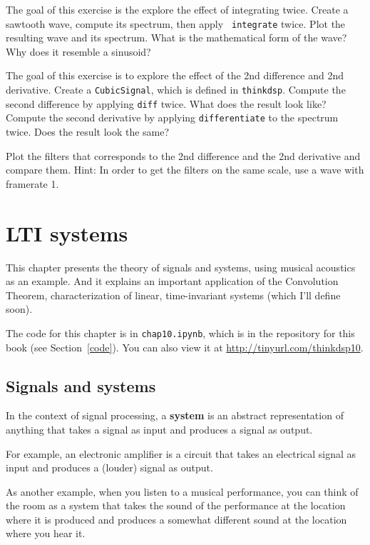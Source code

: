 \documentclass[12pt]{book}
\begin{document}
\begin{exercise}
The goal of this exercise is the explore the effect of integrating
twice. Create a sawtooth wave, compute its spectrum, then apply {\tt
  integrate} twice. Plot the resulting wave and its spectrum. What is
the mathematical form of the wave? Why does it resemble a sinusoid?
\end{exercise}

\begin{exercise}
The goal of this exercise is to explore the effect of the 2nd
difference and 2nd derivative. Create a {\tt CubicSignal}, which is
defined in {\tt thinkdsp}. Compute the second difference by applying
{\tt diff} twice. What does the result look like?  Compute the second
derivative by applying {\tt differentiate} to the spectrum twice.
Does the result look the same?

Plot the filters that corresponds to the 2nd difference and the 2nd
derivative and compare them. Hint: In order to get the filters on the
same scale, use a wave with framerate 1.
\end{exercise}




\chapter{LTI systems}
\label{systems}

This chapter presents the theory of signals and systems, using
musical acoustics as an example.  And it explains an
important application of the Convolution Theorem, characterization
of linear, time-invariant systems (which I'll define soon).

The code for this chapter is in {\tt chap10.ipynb}, which is in the
repository for this book (see Section~\ref{code}).
You can also view it at \url{http://tinyurl.com/thinkdsp10}.



\section{Signals and systems}

In the context of signal processing, a {\bf system} is an abstract
representation of anything that takes a signal as input and produces
a signal as output.

For example, an electronic amplifier is a circuit that takes an
electrical signal as input and produces a (louder) signal as output.

As another example, when you listen to a musical performance, you
can think of the room as a system that takes the sound of the
performance at the location where it is produced and produces a
somewhat different sound at the location where you hear it.
\end{document}
